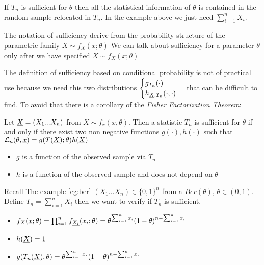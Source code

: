 \begin{oss}
	If $T_n$ is sufficient for $\theta$ then all the statistical information of $\theta$ is contained in the random sample relocated in $T_n$. In the example above we just need $\sum_{i=1}^{n}X_i$.\\
\end{oss}
\begin{oss}
	The notation of sufficiency derive from the probability structure of the parametric family $X\sim f_X(x;\theta)$ We can talk about sufficiency for a parameter $\theta$ only after we have specified $X\sim f_X(x;\theta)$
\end{oss}
The definition of sufficiency based on conditional probability is not of practical use because we need this two distributions $
\begin{cases}
g_{T_n}(\cdot)\\
h_{\underline X,T_n}(\cdot,\cdot)
\end{cases}
$ that can be difficult to find.
To avoid that there is a corollary of the \textit{Fisher Factorization Theorem}:
\begin{corol}\label{corol:Savage}
	Let $\underline X=(X_1... X_n)$ from $X\sim f_x(x,\theta)$. Then a statistic $T_n$ is sufficient for $\theta$ if and only if there exist two non negative functions $g(\cdot), h(\cdot)$ such that $\mathcal{L}_n(\theta,\underline x)=g(T(\underline X);\theta)h(\underline X)$
\end{corol}
\begin{oss}
	\begin{itemize}
		\item $g$ is a function of the observed sample via $T_n$
		\item $h$ is a function of the observed sample and does not depend on $\theta$
 	\end{itemize}
\end{oss}
\begin{eg}
	Recall The example \ref{eg:ber} 
		$(X_1... X_n)\in \{0,1\}^n$ from a $Ber(\theta)$, $\theta \in (0,1)$.\\
	Define $T_n=\sum_{i=1}^{n}X_i$ then we want to verify if $T_n$ is sufficient.
	\begin{itemize}
	 \item $f_{\underline X}(\underline x;\theta) = \prod_{i=1}^{n} f_{\underline{X_i}}(\underline{x_i};\theta)=\theta^{\sum_{i=1}^{n}x_i}(1-\theta)^{n-\sum_{i=1}^{n}x_i}$\\
	\item $h(\underline X)=1$
	\item$g(T_n(\underline X),\theta)=\theta^{\sum_{i=1}^{n}x_i}(1-\theta)^{n-\sum_{i=1}^{n}x_i}$
	\end{itemize}
\end{eg}
